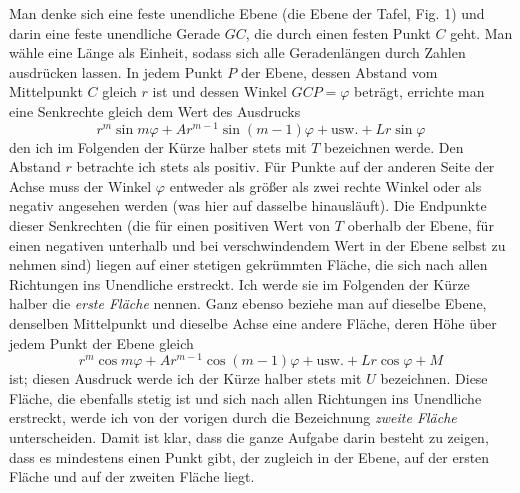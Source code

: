 Man denke sich eine feste unendliche Ebene (die Ebene der Tafel, Fig. 1) und darin eine feste unendliche Gerade $GC$, die durch einen festen Punkt $C$ geht. Man wähle eine Länge als Einheit, sodass sich alle Geradenlängen durch Zahlen ausdrücken lassen. In jedem Punkt $P$ der Ebene, dessen Abstand vom Mittelpunkt $C$ gleich $r$ ist und dessen Winkel $GCP=\varphi$ beträgt, errichte man eine Senkrechte gleich dem Wert des Ausdrucks
\[
r^m\sin m\varphi+Ar^{m-1}\sin(m-1)\varphi+\text{usw.}+Lr\sin\varphi
\]
den ich im Folgenden der Kürze halber stets mit $T$ bezeichnen werde. Den Abstand $r$ betrachte ich stets als positiv. Für Punkte auf der anderen Seite der Achse muss der Winkel $\varphi$ entweder als größer als zwei rechte Winkel oder als negativ angesehen werden (was hier auf dasselbe hinausläuft). Die Endpunkte dieser Senkrechten (die für einen positiven Wert von $T$ oberhalb der Ebene, für einen negativen unterhalb und bei verschwindendem Wert in der Ebene selbst zu nehmen sind) liegen auf einer stetigen gekrümmten Fläche, die sich nach allen Richtungen ins Unendliche erstreckt. Ich werde sie im Folgenden der Kürze halber die \textit{erste Fläche} nennen. Ganz ebenso beziehe man auf dieselbe Ebene, denselben Mittelpunkt und dieselbe Achse eine andere Fläche, deren Höhe über jedem Punkt der Ebene gleich
\[
r^m\cos m\varphi+Ar^{m-1}\cos(m-1)\varphi+\text{usw.}+Lr\cos\varphi+M
\]
ist; diesen Ausdruck werde ich der Kürze halber stets mit $U$ bezeichnen. Diese Fläche, die ebenfalls stetig ist und sich nach allen Richtungen ins Unendliche erstreckt, werde ich von der vorigen durch die Bezeichnung
\textit{zweite Fläche} unterscheiden. Damit ist klar, dass die ganze Aufgabe darin besteht zu zeigen, dass es mindestens einen Punkt gibt, der zugleich in der Ebene, auf der ersten Fläche und auf der zweiten Fläche liegt.

